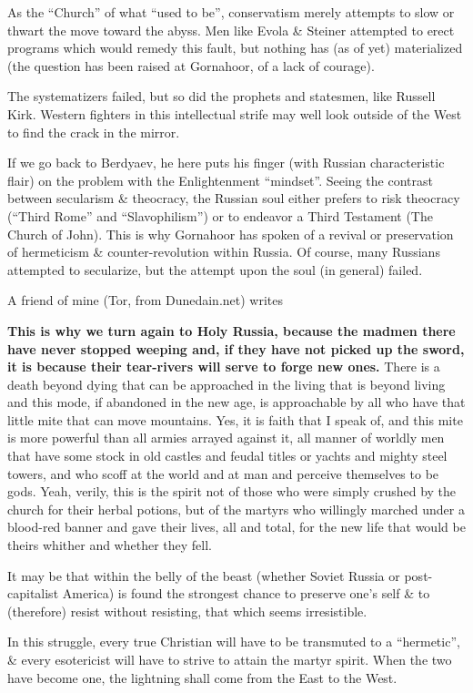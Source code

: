 As the ``Church'' of what ``used to be'', conservatism merely attempts to slow or thwart the move toward the abyss. Men like Evola \& Steiner attempted to erect programs which would remedy this fault, but nothing has (as of yet) materialized (the question has been raised at Gornahoor, of a lack of courage).

The systematizers failed, but so did the prophets and statesmen, like Russell Kirk. Western fighters in this intellectual strife may well look outside of the West to find the crack in the mirror.

If we go back to Berdyaev, he here puts his finger (with Russian characteristic flair) on the problem with the Enlightenment ``mindset''. Seeing the contrast between secularism \& theocracy, the Russian soul either prefers to risk theocracy (``Third Rome'' and ``Slavophilism'') or to endeavor a Third Testament (The Church of John). This is why Gornahoor has spoken of a revival or preservation of hermeticism \& counter-revolution within Russia. Of course, many Russians attempted to secularize, but the attempt upon the soul (in general) failed.

A friend of mine (Tor, from Dunedain.net) writes

\begin{quotex}
\textbf{This is why we turn again to Holy Russia, because the madmen there have never stopped weeping and, if they have not picked up the sword, it is because their tear-rivers will serve to forge new ones.} There is a death beyond dying that can be approached in the living that is beyond living and this mode, if abandoned in the new age, is approachable by all who have that little mite that can move mountains. Yes, it is faith that I speak of, and this mite is more powerful than all armies arrayed against it, all manner of worldly men that have some stock in old castles and feudal titles or yachts and mighty steel towers, and who scoff at the world and at man and perceive themselves to be gods. Yeah, verily, this is the spirit not of those who were simply crushed by the church for their herbal potions, but of the martyrs who willingly marched under a blood-red banner and gave their lives, all and total, for the new life that would be theirs whither and whether they fell.
\end{quotex}


It may be that within the belly of the beast (whether Soviet Russia or post-capitalist America) is found the strongest chance to preserve one's self \& to (therefore) resist without resisting, that which seems irresistible.

In this struggle, every true Christian will have to be transmuted to a ``hermetic'', \& every esotericist will have to strive to attain the martyr spirit. When the two have become one, the lightning shall come from the East to the West.



